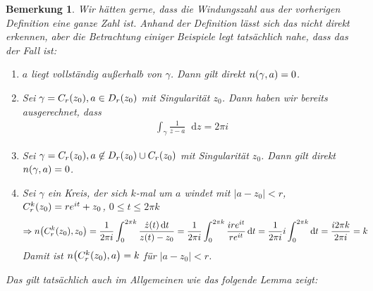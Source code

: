 \documentclass[11pt, a4paper]{article}
\theoremstyle{plain}
\newtheorem{bemerkung}[blockelement]{Bemerkung}
\numberwithin{equation}{subsection}
\newcommand{\of}[1]{\mathopen{}\mathclose{}\bgroup\left(#1\aftergroup\egroup\right)}
\newcommand{\abs}[1]{\left\lvert#1\right\rvert}
\newcommand{\impl}[0]{\Rightarrow{}}
\newcommand{\dif}{\mathop{}\!\mathrm{d}}
\begin{document}
    \begin{bemerkung}
        Wir hätten gerne, dass die Windungszahl aus der vorherigen Definition eine ganze Zahl ist. Anhand der Definition lässt sich das nicht direkt erkennen, aber die Betrachtung einiger Beispiele legt tatsächlich nahe, dass das der Fall ist:
        \begin{enumerate}
            \item $a$ liegt vollständig außerhalb von $\gamma$. Dann gilt direkt $n\of{\gamma, a} = 0$.\\
            \item Sei $\gamma = C_r\of{z_0}, a\in D_r\of{z_0}$ mit Singularität $z_0$. Dann haben wir bereits ausgerechnet, dass
            \begin{align*}
                \int_{\gamma}^{} \frac{1}{z-a} \dif z = 2\pi i
            \end{align*}
            \item Sei $\gamma = C_r\of{z_0}, a\not\in D_r\of{z_0}\cup C_r\of{z_0}$ mit Singularität $z_0$. Dann gilt direkt $n\of{\gamma, a} = 0$.\\
            \item Sei $\gamma$ ein Kreis, der sich $k$-mal um $a$ windet mit $\abs{a-z_0} < r$, $C^k_r\of{z_0} = re^{it} + z_0$, $0 \leq t \leq 2\pi k$
            \begin{align*}
                \impl n\of{C_r^k\of{z_0}, z_0} &= \frac{1}{2\pi i} \int_{0}^{2\pi k} \frac{\dot z\of{t}\dif t}{z\of{t} - z_0} = \frac{1}{2\pi i} \int_{0}^{2\pi k} \frac{ire^{it}}{re^{it}} \dif t = \frac{1}{2\pi i} i \int_{0}^{2\pi k}  \dif t = \frac{i2\pi k}{2\pi i} = k
            \end{align*}
            Damit ist $n\of{C_r^k\of{z_0}, a} = k$ für $\abs{a-z_0} < r$.
        \end{enumerate}
        Das gilt tatsächlich auch im Allgemeinen wie das folgende Lemma zeigt:
    \end{bemerkung}
\end{document}
